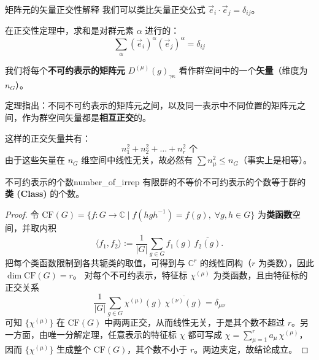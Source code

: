\begin{note}{矩阵元的矢量正交性解释}
    我们可以类比矢量正交公式 $\vec{e}_i \cdot \vec{e}_j = \delta_{ij}$。
    
    在正交性定理中，求和是对群元素 $\alpha$ 进行的：
    \begin{equation}
        \sum_{\alpha} (\vec{e}_i)^\alpha (\vec{e}_j)^\alpha = \delta_{ij}
    \end{equation}
    
    我们将每个\textbf{不可约表示的矩阵元} $D^{(\mu)}(g)_{\gamma\kappa}$ 看作群空间中的一个\textbf{矢量}（维度为 $n_G$）。
    
    定理指出：不同不可约表示的矩阵元之间，以及同一表示中不同位置的矩阵元之间，作为群空间矢量都是\textbf{相互正交}的。
    
    这样的正交矢量共有：
    \begin{equation}
        n_1^2 + n_2^2 + \dots + n_r^2 \text{ 个}
    \end{equation}
    由于这些矢量在 $n_G$ 维空间中线性无关，故必然有 $\sum n_\mu^2 \le n_G$（事实上是相等）。
\end{note}

\begin{theorem}{不可约表示的个数}{number_of_irrep}
    有限群的不等价不可约表示的个数等于群的\textbf{类 (Class)} 的个数。
\end{theorem}

\begin{proof}
    令 $\mathrm{CF}(G)=\{f:G\to \mathbb{C}\mid f(hgh^{-1})=f(g),\;\forall g,h\in G\}$ 为\textbf{类函数}空间，并取内积
    \begin{equation*}
        \langle f_1,f_2\rangle := \frac{1}{|G|} \sum_{g\in G} f_1(g)\, \overline{f_2(g)}.
    \end{equation*}
    把每个类函数限制到各共轭类的取值，可得到与 $\mathbb{C}^r$ 的线性同构（$r$ 为类数），因此 $\dim \mathrm{CF}(G)=r$。
    对每个不可约表示，特征标 $\chi^{(\mu)}$ 为类函数，且由特征标的正交关系
    \begin{equation*}
        \frac{1}{|G|} \sum_{g\in G} \chi^{(\mu)}(g)\, \overline{\chi^{(\nu)}(g)} = \delta_{\mu\nu}
    \end{equation*}
    可知 $\{\chi^{(\mu)}\}$ 在 $\mathrm{CF}(G)$ 中两两正交，从而线性无关，于是其个数不超过 $r$。另一方面，由唯一分解定理，任意表示的特征标 $\chi$ 都可写成 $\chi=\sum_{\mu=1}^r a_\mu\,\chi^{(\mu)}$，因而 $\{\chi^{(\mu)}\}$ 生成整个 $\mathrm{CF}(G)$，其个数不小于 $r$。两边夹定，故结论成立。
\end{proof}




